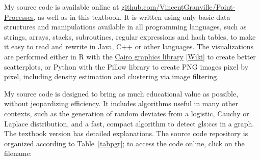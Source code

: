 \documentclass[10pt]{article}
\begin{document}
My source code is available online at \href{https://github.com/VincentGranville/Point-Processes}{github.com/VincentGranville/Point-Processes}, as well
as in this textbook. It is written using only basic data structures and manipulations available in all programming languages, such as
strings, arrays, stacks, subroutines, regular expressions and \textcolor{index}{hash tables},
to make it easy to read and rewrite in Java, C++ or other languages. The visualizations are performed either in R with the 
\href{https://www.cairographics.org/}{Cairo graphics library} 
[\href{https://en.wikipedia.org/wiki/Cairo_(graphics)}{Wiki}] to create better scatterplots, or Python with the Pillow library to create PNG images pixel by pixel, 
including density estimation and clustering via image filtering. 

My source code is designed to bring as much educational value as possible, without jeopardizing efficiency. It includes algorithms useful in many other contexts, such as the generation of random deviates from a logistic, Cauchy or Laplace distribution,  and a fast, compact algorithm to detect 
\glspl{gls:cc} in a graph.
The textbook version has detailed explanations. The source code
repository is organized according to Table~\ref{tabpgr}; to access the code online, click on the filename:
\end{document}
